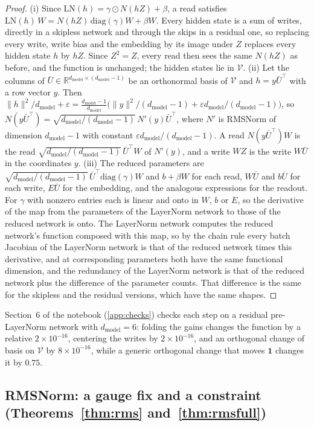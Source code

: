 \documentclass[10pt]{article}
\theoremstyle{definition}
\theoremstyle{remark}
\newcommand{\R}{\mathbb{R}}
\newcommand{\dm}{d_{\mathrm{model}}}
\newcommand{\norm}[1]{\lVert #1\rVert}
\begin{document}
\begin{proof}
(i) Since $\mathrm{LN}(h) = \gamma\odot N(hZ) + \beta$, a read satisfies $\mathrm{LN}(h)\,W = N(hZ)\,\mathrm{diag}(\gamma)W + \beta W$. Every hidden state is a sum of writes, directly in a skipless network and through the skips in a residual one, so replacing every write, write bias and the embedding by its image under $Z$ replaces every hidden state $h$ by $hZ$. Since $Z^2 = Z$, every read then sees the same $N(hZ)$ as before, and the function is unchanged; the hidden states lie in $\mathcal V$.
(ii) Let the columns of $\bar U \in \R^{\dm\times(\dm-1)}$ be an orthonormal basis of $\mathcal V$ and $h = y\bar U^\top$ with a row vector $y$. Then $\norm{h}^2/\dm + \varepsilon = \tfrac{\dm-1}{\dm}\big(\norm{y}^2/(\dm-1) + \varepsilon \dm/(\dm-1)\big)$, so $N(y\bar U^\top) = \sqrt{\dm/(\dm-1)}\,N'(y)\bar U^\top$, where $N'$ is RMSNorm of dimension $\dm-1$ with constant $\varepsilon \dm/(\dm-1)$. A read $N(y\bar U^\top)W$ is the read $\sqrt{\dm/(\dm-1)}\,\bar U^\top W$ of $N'(y)$, and a write $WZ$ is the write $W\bar U$ in the coordinates $y$.
(iii) The reduced parameters are $\sqrt{\dm/(\dm-1)}\,\bar U^\top\mathrm{diag}(\gamma)W$ and $b + \beta W$ for each read, $W\bar U$ and $b\bar U$ for each write, $E\bar U$ for the embedding, and the analogous expressions for the readout. For $\gamma$ with nonzero entries each is linear and onto in $W$, $b$ or $E$, so the derivative of the map from the parameters of the LayerNorm network to those of the reduced network is onto. The LayerNorm network computes the reduced network's function composed with this map, so by the chain rule every batch Jacobian of the LayerNorm network is that of the reduced network times this derivative, and at corresponding parameters both have the same functional dimension, and the redundancy of the LayerNorm network is that of the reduced network plus the difference of the parameter counts. That difference is the same for the skipless and the residual versions, which have the same shapes.
\end{proof}

Section~6 of the notebook (\cref{app:checks}) checks each step on a residual pre-LayerNorm network with $\dm = 6$: folding the gains changes the function by a relative $2\times10^{-16}$, centering the writes by $2\times10^{-16}$, and an orthogonal change of basis on $\mathcal V$ by $8\times10^{-16}$, while a generic orthogonal change that moves $\mathbf 1$ changes it by $0.75$.

\subsection{RMSNorm: a gauge fix and a constraint\texorpdfstring{ (Theorems~\ref*{thm:rms} and~\ref*{thm:rmsfull})}{}}\label{app:prf-rms}
\end{document}
